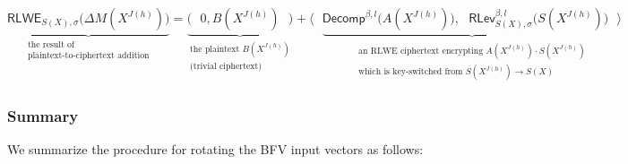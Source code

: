 $ $

\noindent $\underbrace{\textsf{RLWE}_{S(X),\sigma}\bm{(}\Delta M(X^{J(h)})\bm{)}}_{\substack{\text{the result of} \\ \text{plaintext-to-ciphertext addition}}} = \underbrace{\bm{(} \text{ } 0, B(X^{J(h)}) \text{ } \bm{)}}_{\substack{\text{the plaintext } B(X^{J(h)}) \\ \text{(trivial ciphertext)}}} + \bm{\langle} \text{ } \underbrace{\textsf{Decomp}^{\beta, l}\bm{(}A(X^{J(h)})\bm{)}, \text{ } \textsf{RLev}_{S(X), \sigma}^{\beta, l}\bm{(}S(X^{J(h)})\bm{)} \text{ } \bm{\rangle}}_{\substack{\substack{\text{an RLWE ciphertext encrypting $A(X^{J(h)}) \cdot S(X^{J(h)})$}\\ \text{which is key-switched from $S(X^{J(h)})\rightarrow S(X)$}}}}$



\subsubsection{Summary}
\label{subsubsec:bfv-rotation-summary}

We summarize the procedure for rotating the BFV input vectors as follows: 

